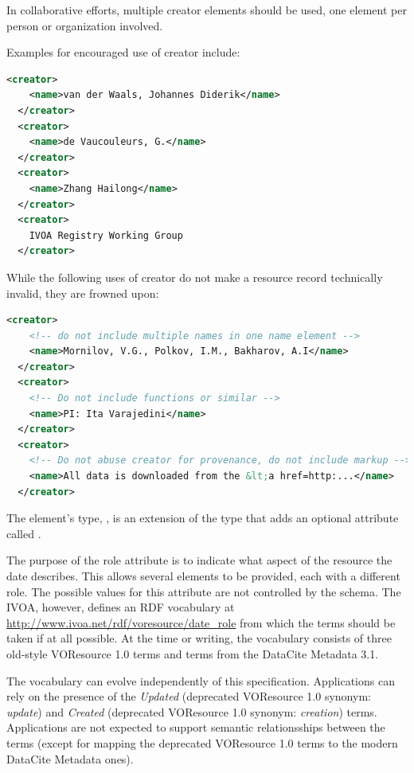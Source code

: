 \documentclass[11pt,a4paper]{ivoa}
\begin{document}
In collaborative efforts, multiple creator elements should be used, one
element per person or organization involved.

Examples for encouraged use of creator include:

\begin{lstlisting}[language=XML]
  <creator>
    <name>van der Waals, Johannes Diderik</name>
  </creator>
  <creator>
    <name>de Vaucouleurs, G.</name>
  </creator>
  <creator>
    <name>Zhang Hailong</name>
  </creator>
  <creator>
    IVOA Registry Working Group
  </creator>
\end{lstlisting}

While the following uses of creator do not make a resource record
technically invalid, they are frowned upon:

\begin{lstlisting}[language=XML]
  <creator>
    <!-- do not include multiple names in one name element -->
    <name>Mornilov, V.G., Polkov, I.M., Bakharov, A.I</name>
  </creator>
  <creator>
    <!-- Do not include functions or similar -->
    <name>PI: Ita Varajedini</name>
  </creator>
  <creator>
    <!-- Do not abuse creator for provenance, do not include markup -->
    <name>All data is downloaded from the &lt;a href=http:...</name>
  </creator>
\end{lstlisting}

The  element's type, , is an extension of the
 type that adds an
optional attribute called .  

The purpose of the role attribute is to indicate what aspect of the
resource the date describes. This allows several  elements to be
provided, each with a different role. The possible values for this
attribute are not controlled by the schema.  The IVOA, however, defines
an RDF vocabulary at
\url{http://www.ivoa.net/rdf/voresource/date_role} from
which the  terms should be taken if at all possible.  At the
time or writing, the vocabulary consists of three old-style VOResource
1.0 terms and terms from the DataCite Metadata 3.1.

The vocabulary can evolve independently of this specification.
Applications can rely on the presence of the \textsl{Updated}
(deprecated VOResource 1.0 synonym: \textsl{update}) and
\textsl{Created} (deprecated VOResource 1.0 synonym: \textsl{creation})
terms.  Applications are not expected to support semantic relationsships
between the terms (except for mapping the deprecated VOResource 1.0
terms to the modern DataCite Metadata ones).
\end{document}
